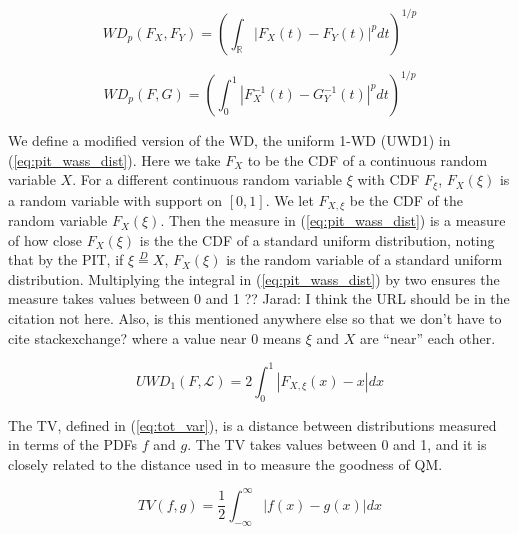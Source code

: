 \documentclass[preprint,12pt,authoryear]{elsarticle}
\newcommand{\1}[1]{\mathds{1}\left[#1\right]}
\newcommand{\jarad}[1]{{\color{red} ?? Jarad: #1}}
\begin{document}
\begin{equation}
    \label{eq:wass_dist_cdf}
    WD_p (F_X, F_Y) = \left( \int_{\mathbb{R}} |F_X(t) - F_Y(t)|^p dt\right)^{1/p}
\end{equation}

\begin{equation}
    \label{eq:wass_dist_quant}
    WD_p (F, G) = \left( \int_0^1 |F^{-1}_X(t) - G^{-1}_Y(t)|^p dt \right)^{1/p}
\end{equation}

We define a modified version of the WD, the uniform 1-WD (UWD1) in 
(\ref{eq:pit_wass_dist}). Here we take $F_X$ to be the CDF of a continuous 
random variable $X$. For a different continuous random variable $\xi$ with CDF 
$F_{\xi}$, $F_X(\xi)$ is a random variable with support on $[0,1]$. We let 
$F_{X,\xi}$ be the CDF of the random variable $F_X(\xi)$. Then the measure in 
(\ref{eq:pit_wass_dist}) is a measure of how close $F_X(\xi)$ is the the CDF of 
a standard uniform distribution, noting that by the PIT, if 
$\xi \overset{D}{=} X$, $F_X(\xi)$ is the random variable of a standard uniform 
distribution. Multiplying the integral in (\ref{eq:pit_wass_dist}) by two 
ensures the measure takes values between 0 and 1 
\cite[]{645854} \jarad{I think the URL should be in the citation not here. Also, is this mentioned anywhere else so that we don't have to cite stackexchange?}
where a value near 0 means $\xi$ and $X$ are ``near'' each other.

\begin{equation}
    \label{eq:pit_wass_dist}
    UWD_1(F, \mathcal{L}) = 2\int_0^1 |F_{X,\xi} (x) - x|dx
\end{equation}



The TV, defined in (\ref{eq:tot_var}), is a distance between distributions 
measured in terms of the PDFs $f$ and $g$. The TV takes values between 0 and 1, 
and it is closely related to the distance used in 
\cite{sgouropoulos2015matching} to measure the goodness of QM.  

\begin{equation}
    \label{eq:tot_var}
    TV(f,g) = \frac{1}{2} \int_{-\infty}^{\infty}|f(x) - g(x) | dx
\end{equation}

\end{document}
